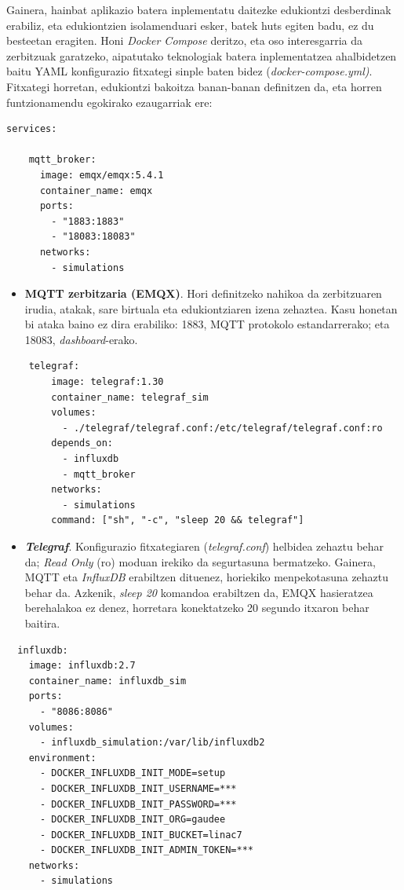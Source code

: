 \documentclass[12pt]{article}
\numberwithin{figure}{section}
\numberwithin{equation}{section}
\begin{document}
Gainera, hainbat aplikazio batera inplementatu daitezke edukiontzi desberdinak erabiliz, eta edukiontzien isolamenduari esker, batek huts egiten badu, ez du besteetan eragiten. Honi \textit{Docker Compose} deritzo, eta oso interesgarria da zerbitzuak garatzeko, aipatutako teknologiak batera inplementatzea ahalbidetzen baitu YAML konfigurazio fitxategi sinple baten bidez (\textit{docker-compose.yml)}. Fitxategi horretan, edukiontzi bakoitza banan-banan definitzen da, eta horren funtzionamendu egokirako ezaugarriak ere:

\begin{verbatim}
services:

    mqtt_broker:
      image: emqx/emqx:5.4.1
      container_name: emqx
      ports:
        - "1883:1883"
        - "18083:18083"
      networks:
        - simulations
\end{verbatim}

\begin{itemize}
    \item \textbf{MQTT zerbitzaria (EMQX)}. Hori definitzeko nahikoa da zerbitzuaren irudia, atakak, sare birtuala eta edukiontziaren izena zehaztea. Kasu honetan bi ataka baino ez dira erabiliko: 1883, MQTT protokolo estandarrerako; eta 18083, \textit{dashboard}-erako.
\end{itemize}
\newpage
\begin{verbatim}
    telegraf:
        image: telegraf:1.30
        container_name: telegraf_sim
        volumes:
          - ./telegraf/telegraf.conf:/etc/telegraf/telegraf.conf:ro
        depends_on:
          - influxdb
          - mqtt_broker
        networks:
          - simulations
        command: ["sh", "-c", "sleep 20 && telegraf"]
\end{verbatim}

\begin{itemize}
    \item \textbf{\textit{Telegraf}}. Konfigurazio fitxategiaren (\textit{telegraf.conf}) helbidea zehaztu behar da; \textit{Read Only} (ro) moduan irekiko da segurtasuna bermatzeko. Gainera, MQTT eta \textit{InfluxDB} erabiltzen dituenez, horiekiko menpekotasuna zehaztu behar da. Azkenik, \textit{sleep 20} komandoa erabiltzen da, EMQX hasieratzea berehalakoa ez denez, horretara konektatzeko 20 segundo itxaron behar baitira.
\end{itemize}

\begin{verbatim}
  influxdb:
    image: influxdb:2.7
    container_name: influxdb_sim
    ports:
      - "8086:8086"
    volumes:
      - influxdb_simulation:/var/lib/influxdb2
    environment:
      - DOCKER_INFLUXDB_INIT_MODE=setup
      - DOCKER_INFLUXDB_INIT_USERNAME=***
      - DOCKER_INFLUXDB_INIT_PASSWORD=***
      - DOCKER_INFLUXDB_INIT_ORG=gaudee
      - DOCKER_INFLUXDB_INIT_BUCKET=linac7
      - DOCKER_INFLUXDB_INIT_ADMIN_TOKEN=***
    networks:
      - simulations
\end{verbatim}
\end{document}
